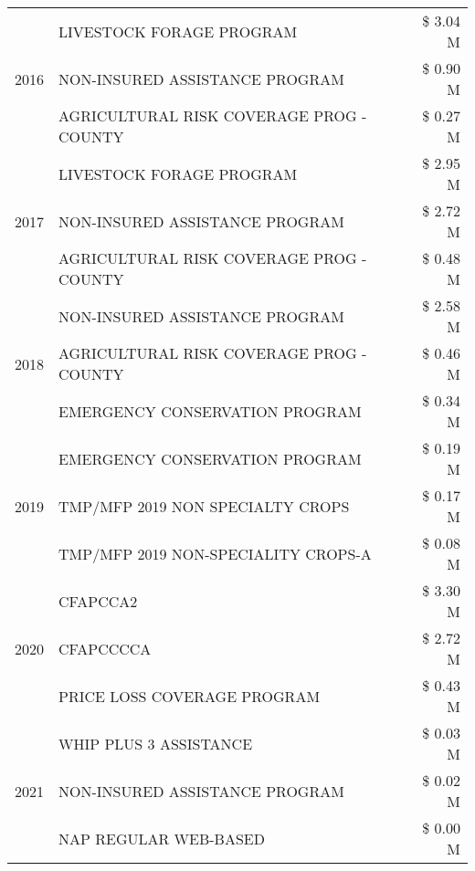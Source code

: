 \begin{tabular}{llr}
\cline{1-3}
\multirow[t]{3}{*}{2016} & LIVESTOCK FORAGE PROGRAM & \$ 3.04 M \\
 & NON-INSURED ASSISTANCE PROGRAM & \$ 0.90 M \\
 & AGRICULTURAL RISK COVERAGE PROG - COUNTY & \$ 0.27 M \\
\cline{1-3}
\multirow[t]{3}{*}{2017} & LIVESTOCK FORAGE PROGRAM & \$ 2.95 M \\
 & NON-INSURED ASSISTANCE PROGRAM & \$ 2.72 M \\
 & AGRICULTURAL RISK COVERAGE PROG - COUNTY & \$ 0.48 M \\
\cline{1-3}
\multirow[t]{3}{*}{2018} & NON-INSURED ASSISTANCE PROGRAM & \$ 2.58 M \\
 & AGRICULTURAL RISK COVERAGE PROG - COUNTY & \$ 0.46 M \\
 & EMERGENCY CONSERVATION PROGRAM & \$ 0.34 M \\
\cline{1-3}
\multirow[t]{3}{*}{2019} & EMERGENCY CONSERVATION PROGRAM & \$ 0.19 M \\
 & TMP/MFP 2019 NON SPECIALTY CROPS & \$ 0.17 M \\
 & TMP/MFP 2019 NON-SPECIALITY CROPS-A & \$ 0.08 M \\
\cline{1-3}
\multirow[t]{3}{*}{2020} & CFAPCCA2 & \$ 3.30 M \\
 & CFAPCCCCA & \$ 2.72 M \\
 & PRICE LOSS COVERAGE PROGRAM & \$ 0.43 M \\
\cline{1-3}
\multirow[t]{3}{*}{2021} & WHIP PLUS 3 ASSISTANCE & \$ 0.03 M \\
 & NON-INSURED ASSISTANCE PROGRAM & \$ 0.02 M \\
 & NAP REGULAR WEB-BASED & \$ 0.00 M \\
\cline{1-3}
\bottomrule
\end{tabular}

